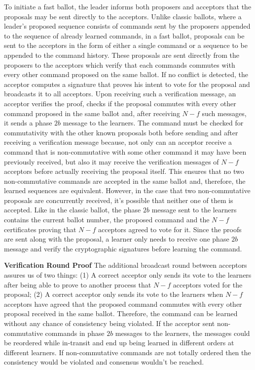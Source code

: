 To initiate a fast ballot, the leader informs both proposers and acceptors that the proposals may be sent directly to the acceptors. Unlike classic ballots, where a leader's proposed sequence consists of commands sent by the proposers appended to the sequence of already learned commands, in a fast ballot, proposals can be sent to the acceptors in the form of either a single command or a sequence to be appended to the command history. These proposals are sent directly from the proposers to the acceptors which verify that each commands commutes with every other command proposed on the same ballot. If no conflict is detected, the acceptor computes a signature that proves his intent to vote for the proposal and broadcasts it to all acceptors. Upon receiving such a verification message, an acceptor verifies the proof, checks if the proposal commutes with every other command proposed in the same ballot and, after receiving $N-f$ such messages, it sends a phase $2b$ message to the learners. The command must be checked for commutativity with the other known proposals both before sending and after receiving a verification message because, not only can an acceptor receive a command that is non-commutative with some other command it may have been previously received, but also it may receive the verification messages of $N-f$ acceptors before actually receiving the proposal itself. This ensures that no two non-commutative commands are accepted in the same ballot and, therefore, the learned sequences are equivalent. However, in the case that two non-commutative proposals are concurrently received, it's possible that neither one of them is accepted. Like in the classic ballot, the phase $2b$ message sent to the learners contains the current ballot number, the proposed command and the $N-f$ certificates proving that $N-f$ acceptors agreed to vote for it. Since the proofs are sent along with the proposal, a learner only needs to receive one phase $2b$ message and verify the cryptographic signatures before learning the command.\par
\textbf{Verification Round Proof} 
The additional broadcast round between acceptors assures us of two things: (1) A correct acceptor only sends its vote to the learners after being able to prove to another process that $N-f$ acceptors voted for the proposal; (2) A correct acceptor only sends its vote to the learners when $N-f$ acceptors have agreed that the proposed command commutes with every other proposal received in the same ballot. Therefore, the command can be learned without any chance of consistency being violated. If the acceptor sent non-commutative commands in phase $2b$ messages to the learners, the messages could be reordered while in-transit and end up being learned in different orders at different learners. If non-commutative commands are not totally ordered then the consistency would be violated and consensus wouldn't be reached. \par
